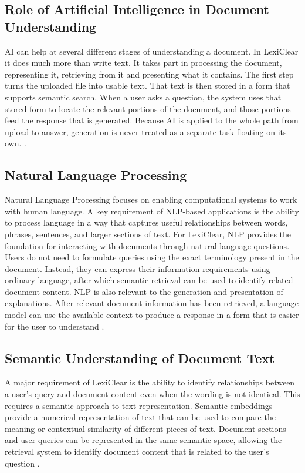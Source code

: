\documentclass[12pt,a4paper,oneside]{report}
\begin{document}
\subsection{Role of Artificial Intelligence in Document Understanding}

AI can help at several different stages of understanding a document. In LexiClear it does much more than write text. It takes part in processing the document, representing it, retrieving from it and presenting what it contains. The first step turns the uploaded file into usable text. That text is then stored in a form that supports semantic search. When a user asks a question, the system uses that stored form to locate the relevant portions of the document, and those portions feed the response that is generated. Because AI is applied to the whole path from upload to answer, generation is never treated as a separate task floating on its own. \cite{mahoney2019,pramanik2025}.

\subsection{Natural Language Processing}

Natural Language Processing focuses on enabling computational systems to
work with human language. A key requirement of NLP-based applications is the
ability to process language in a way that captures useful relationships
between words, phrases, sentences, and larger sections of text. For LexiClear, NLP provides the foundation for interacting with documents
through natural-language questions. Users do not need to formulate queries
using the exact terminology present in the document. Instead, they can
express their information requirements using ordinary language, after which
semantic retrieval can be used to identify related document content. NLP is also relevant to the generation and presentation of explanations.
After relevant document information has been retrieved, a language model can
use the available context to produce a response in a form that is easier for
the user to understand \cite{bommarito2018lexnlp}.

\subsection{Semantic Understanding of Document Text}

A major requirement of LexiClear is the ability to identify relationships
between a user's query and document content even when the wording is not
identical. This requires a semantic approach to text representation. Semantic embeddings provide a numerical representation of text that can be
used to compare the meaning or contextual similarity of different pieces of
text. Document sections and user queries can be represented in the same
semantic space, allowing the retrieval system to identify document content
that is related to the user's question \cite{reimers2019sbert}.
\end{document}
